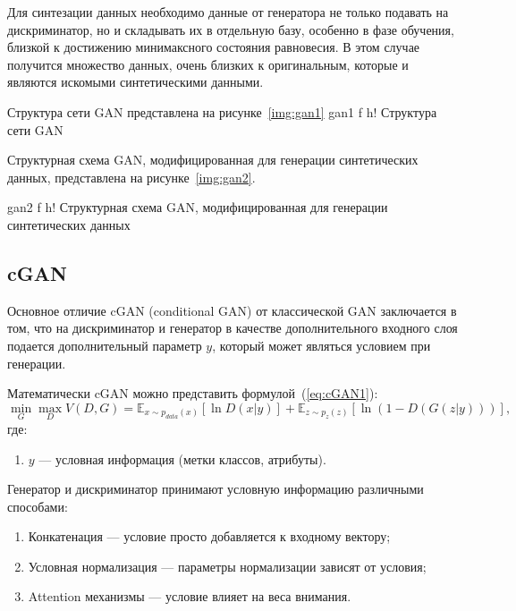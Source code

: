 Для синтезации данных необходимо данные от генератора не только подавать на дискриминатор, но и складывать их в отдельную базу, особенно в фазе обучения, близкой к достижению минимаксного состояния равновесия.
В этом случае получится множество данных, очень близких к оригинальным, которые и являются искомыми синтетическими данными.~\cite{gan_r}

Структура сети GAN представлена на рисунке~\ref{img:gan1}
{gan1} %
{f} %
{h!} %
{\textwidth} %
{Структура сети GAN} %

Структурная схема GAN, модифицированная для генерации синтетических данных, представлена на рисунке~\ref{img:gan2}.

{gan2} %
{f} %
{h!} %
{\textwidth} %
{Структурная схема GAN, модифицированная для генерации синтетических данных} %

\clearpage
\subsection{cGAN}

Основное отличие cGAN (conditional GAN) от классической GAN заключается в том, что на дискриминатор и генератор в качестве дополнительного входного слоя подается дополнительный параметр $y$, который может являться условием при генерации.~\cite{cgan}

Математически cGAN можно представить формулой~(\ref{eq:cGAN1}):
\begin{equation}\label{eq:cGAN1}
    \min_G \max_D V(D,G) = \mathbb{E}_{x \sim p_{data}(x)}[\ln D(x|y)] + \mathbb{E}_{z \sim p_z(z)}[\ln(1-D(G(z|y)))],
\end{equation}
где:
\begin{enumerate}[label*=---]
	\item $y$ --- условная информация (метки классов, атрибуты).
\end{enumerate}
Генератор и дискриминатор принимают условную информацию различными способами:
\begin{enumerate}[label*=---]
	\item Конкатенация --- условие просто добавляется к входному вектору;
	\item Условная нормализация --- параметры нормализации зависят от условия;
	\item Attention механизмы --- условие влияет на веса внимания.
\end{enumerate}

